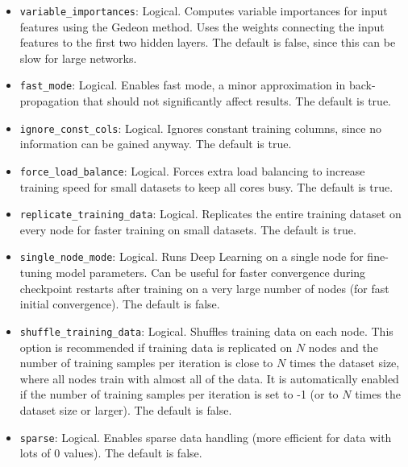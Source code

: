 {{\begin{itemize}

\item \texttt{variable\_importances}: Logical. Computes variable importances for input features using the Gedeon method. Uses the weights connecting the input features to the first two hidden layers. The default is false, since this can be slow for large networks. 

\item \texttt{fast\_mode}: Logical. Enables fast mode, a minor approximation in back-propagation that should not significantly affect results. The default is true.

\item \texttt{ignore\_const\_cols}: Logical. Ignores constant training columns, since no information can be gained anyway.  The default is true.

\item \texttt{force\_load\_balance}:  Logical. Forces extra load balancing to increase training speed for small datasets to keep all cores busy. The default is true.

\item \texttt{replicate\_training\_data}:  Logical. Replicates the entire training dataset on every node for faster training on small datasets. The default is true.

\item \texttt{single\_node\_mode}:  Logical. Runs Deep Learning on a single node for fine-tuning model parameters. Can be useful for faster convergence during checkpoint restarts after training on a very large number of nodes (for fast initial convergence). The default is false.

\item \texttt{shuffle\_training\_data}: Logical. Shuffles training data on each node. This option is recommended if training data is replicated on $N$ nodes and the number of training samples per iteration is close to $N$ times the dataset size, where all nodes train with almost all of the data. It is automatically enabled if the number of training samples per iteration is set to -1 (or to $N$ times the dataset size or larger).  The default is false.

\item \texttt{sparse}: Logical. Enables sparse data handling (more efficient for data with lots of 0 values).
The default is false.


\end{itemize}}}
